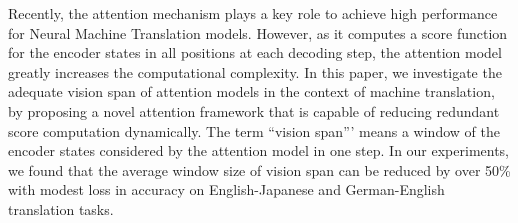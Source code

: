 Recently, the attention mechanism plays a key role to achieve high performance for Neural Machine Translation models. However, as it computes a score function for the encoder states in all positions at each decoding step, the attention model greatly increases the computational complexity. In this paper, we investigate the adequate vision span of attention models in the context of machine translation, by proposing a novel attention framework that is capable of reducing redundant score computation dynamically. The term ``vision span''' means a window of the encoder states considered by the attention model in one step. In our experiments, we found that the average window size of vision span can be reduced by over 50\% with modest loss in accuracy on English-Japanese and German-English translation tasks.
